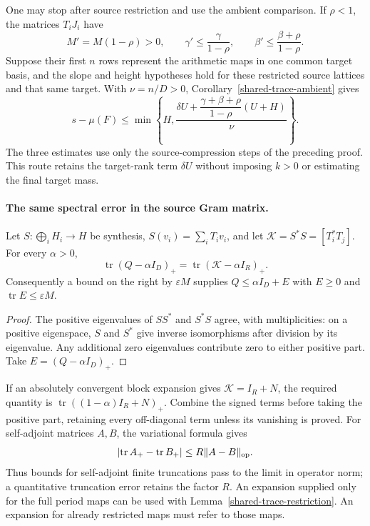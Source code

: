 One may stop after source restriction and use the ambient comparison.
If \(\rho<1\), the matrices \(T_iJ_i\) have
\[
 M'=M(1-\rho)>0,\qquad
 \gamma'\le\frac{\gamma}{1-\rho},\qquad
 \beta'\le\frac{\beta+\rho}{1-\rho}.
\]
Suppose their first \(n\) rows represent the arithmetic maps in one
common target basis, and the slope and height hypotheses hold for
these restricted source lattices and that same target.
With \(\nu=n/D>0\), Corollary~\ref{shared-trace-ambient} gives
\begin{equation}\label{shared-trace-source-only}
 s-\mu(F)\le
 \min\left\{H,\frac{\delta U+
              \dfrac{\gamma+\beta+\rho}{1-\rho}(U+H)}{\nu}\right\}.
\end{equation}
The three estimates use only the source-compression steps of the
preceding proof. This route retains the target-rank term \(\delta U\)
without imposing \(k>0\) or estimating the final target mass.

\paragraph{The same spectral error in the source Gram matrix.}
\begin{lemma}
\label{shared-trace-spectrum}
Let \(S:\bigoplus_iH_i\to H\) be synthesis,
\(S(v_i)=\sum_iT_iv_i\), and let
\(\mathcal K=S^*S=[T_i^*T_j]\). For every \(\alpha>0\),
\begin{equation}\label{shared-trace-spectrum-identity}
 \operatorname{tr}(Q-\alpha I_D)_+
       =\operatorname{tr}(\mathcal K-\alpha I_R)_+.
\end{equation}
Consequently a bound on the right by \(\varepsilon M\) supplies
\(Q\le\alpha I_D+E\) with \(E\ge0\) and
\(\operatorname{tr}E\le\varepsilon M\).
\end{lemma}

\begin{proof}
The positive eigenvalues of \(SS^*\) and \(S^*S\) agree, with
multiplicities: on a positive eigenspace, \(S\) and \(S^*\) give
inverse isomorphisms after division by its eigenvalue.
Any additional zero eigenvalues contribute zero to either positive
part. Take \(E=(Q-\alpha I_D)_+\).
\end{proof}

If an absolutely convergent block expansion gives
\(\mathcal K=I_R+N\), the required quantity is
\(\operatorname{tr}((1-\alpha)I_R+N)_+\).
Combine the signed terms before taking the positive part, retaining
every off-diagonal term unless its vanishing is proved.
For self-adjoint matrices \(A,B\), the variational formula gives
\[
 \left|\operatorname{tr}A_+-\operatorname{tr}B_+\right|
       \le R\|A-B\|_{\rm op}.
\]
Thus bounds for self-adjoint finite truncations pass to the limit
in operator norm; a quantitative truncation error retains the
factor \(R\). An expansion supplied only for the full period maps
can be used with Lemma~\ref{shared-trace-restriction}.
An expansion for already restricted maps must refer to those maps.
